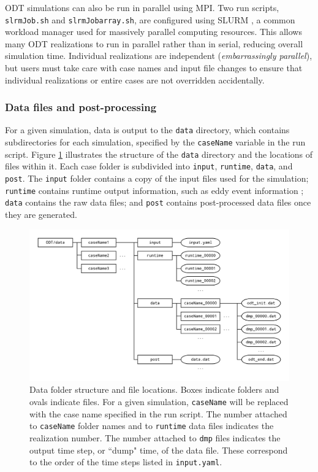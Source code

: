 \documentclass[preprint,12pt, a4paper]{elsarticle}
\begin{document}
ODT simulations can also be run in parallel using MPI. Two run scripts, \texttt{slrmJob.sh} and \texttt{slrmJob\textunderscore array.sh}, are configured using SLURM \cite{Yoo_2003}, a common workload manager used for massively parallel computing resources. This allows many ODT realizations to run in parallel rather than in serial, reducing overall simulation time. Individual realizations are independent (\emph{embarrassingly parallel}), but users must take care with case names and input file changes to ensure that individual realizations or entire cases are not overridden accidentally. 

\subsubsection{Data files and post-processing}

For a given simulation, data is output to the \texttt{data} directory, which contains subdirectories for each simulation, specified by the \texttt{caseName} variable in the run script. Figure \ref{fig:data_folder_structure} illustrates the structure of the \texttt{data} directory and the locations of files within it. Each case folder is subdivided into \texttt{input}, \texttt{runtime}, \texttt{data}, and \texttt{post}. The \texttt{input} folder contains a copy of the input files used for the simulation; \texttt{runtime} contains runtime output information, such as eddy event information ; \texttt{data} contains the raw data files; and \texttt{post} contains post-processed data files once they are generated. 

\begin{figure}
	\centering
	\includegraphics[width=\textwidth]{../figures/data_folder_structure/data_folder_structure.png} 
	\caption{Data folder structure and file locations. Boxes indicate folders and ovals indicate files. For a given simulation, \texttt{caseName} will be replaced with the case name specified in the run script. The number attached to \texttt{caseName} folder names and to \texttt{runtime} data files indicates the realization number. The number attached to \texttt{dmp} files indicates the output time step, or ``dump" time, of the data file. These correspond to the order of the time steps listed in \texttt{input.yaml}.}
	\label{fig:data_folder_structure}
\end{figure}
\end{document}
